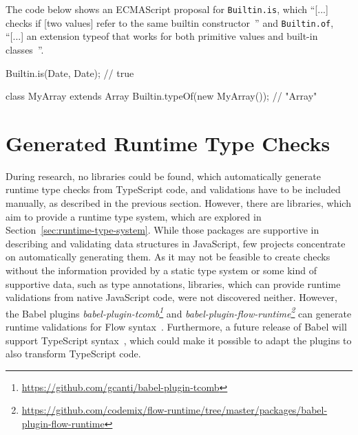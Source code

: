 \begin{program}
\caption{The code below shows an ECMAScript proposal for \texttt{Builtin.is}, which ``[...] checks if [two values] refer to the same builtin constructor~\cite{DynamicTypeChecks:Rauschmayer:2017}'' and \texttt{Builtin.of}, ``[...] an extension typeof that works for both primitive values and built-in classes~\cite{DynamicTypeChecks:Rauschmayer:2017}''.~\cites{DynamicTypeChecks:Rauschmayer:2017, BuiltinProposalRepo}}
\label{prog:runtime-checks-builtin}
\begin{JsCode}
Builtin.is(Date, Date); // true

class MyArray extends Array { }
Builtin.typeOf(new MyArray()); // "Array"
\end{JsCode}
\end{program}


\section{Generated Runtime Type Checks}
\label{sec:existing-projects}

During research, no libraries could be found, which automatically generate runtime type checks from TypeScript code, and validations have to be included manually, as described in the previous section. However, there are libraries, which aim to provide a runtime type system, which are explored in Section~\ref{sec:runtime-type-system}. While those packages are supportive in describing and validating data structures in JavaScript, few projects concentrate on automatically generating them. As it may not be feasible to create checks without the information provided by a static type system or some kind of supportive data, such as type annotations, libraries, which can provide runtime validations from native JavaScript code, were not discovered neither. However, the Babel plugins \emph{babel-plugin-tcomb\footnote{\url{https://github.com/gcanti/babel-plugin-tcomb}}} and \emph{babel-plugin-flow-runtime\footnote{\url{https://github.com/codemix/flow-runtime/tree/master/packages/babel-plugin-flow-runtime}}} can generate runtime validations for Flow syntax~\cites{RuntimeTypeSystem:tcomb:babel, RuntimeTypeSystem:flow-runtime:babel}. Furthermore, a future release of Babel will support TypeScript syntax~\cite{Babel:TypeScript}, which could make it possible to adapt the plugins to also transform TypeScript code.
